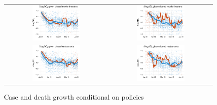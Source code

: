 \documentclass[3p, longtitle]{elsarticle}
\theoremstyle{definition}
\begin{document}
\begin{figure}
  \caption{Case and death growth conditional on policies \label{fig:growthpolicies2}}
  \begin{minipage}{\linewidth}
    \centering
    \begin{tabular}{cc}
      \includegraphics[width=0.483\textwidth]{tables_and_figures/pmovie-cases-14}
      &
        \includegraphics[width=0.483\textwidth]{tables_and_figures/pmovie-deaths-21}
      \\
      \includegraphics[width=0.483\textwidth]{tables_and_figures/prestaurant-cases-14}
      &
        \includegraphics[width=0.483\textwidth]{tables_and_figures/prestaurant-deaths-21}

\end{tabular}
\end{minipage}
\end{figure}
\end{document}
